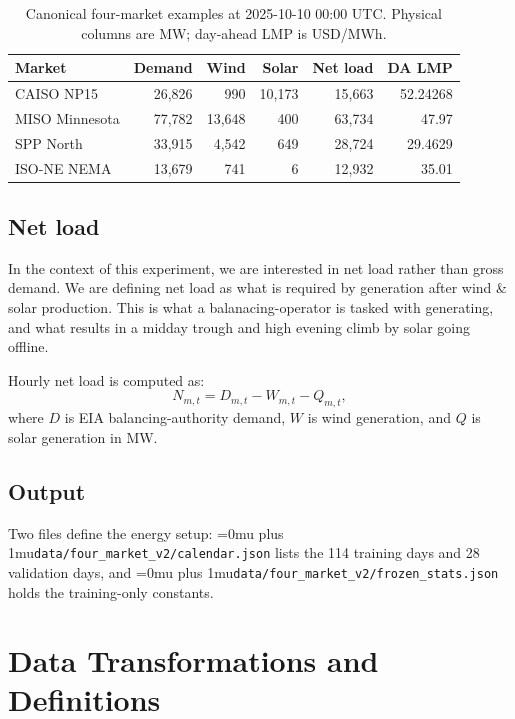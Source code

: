 \documentclass[conference]{IEEEtran}
\newcommand{\codepath}[1]{{\Urlmuskip=0mu plus 1mu\relax\nolinkurl{#1}}}
\begin{document}
\begin{table}[htbp]
  \centering
  \footnotesize
  \caption{Canonical four-market examples at 2025-10-10 00:00 UTC. Physical
  columns are MW; day-ahead LMP is USD/MWh.}
  \label{tab:energy-example-rows}
  \setlength{\tabcolsep}{4pt}
  \begin{tabular}{@{}lrrrrr@{}}
    \toprule
    Market & Demand & Wind & Solar & Net load & DA LMP \\
    \midrule
    CAISO NP15 & 26,826 & 990 & 10,173 & 15,663 & 52.24268 \\
    MISO Minnesota & 77,782 & 13,648 & 400 & 63,734 & 47.97 \\
    SPP North & 33,915 & 4,542 & 649 & 28,724 & 29.4629 \\
    ISO-NE NEMA & 13,679 & 741 & 6 & 12,932 & 35.01 \\
    \bottomrule
  \end{tabular}
\end{table}

\subsection{Net load}
\label{subsec:energy-net-load}

In the context of this experiment, we are interested in net load rather than gross demand. We are defining net load as what is required by generation after wind \& solar production. This is what a balanacing-operator is tasked with generating, and what results in a midday trough and high evening climb by solar going offline. 

Hourly net load is computed as:
\begin{equation}
  N_{m,t}
  =
  D_{m,t} - W_{m,t} - Q_{m,t},
  \label{eq:energy-net-load}
\end{equation}
where \(D\) is EIA balancing-authority demand, \(W\) is wind generation, and
\(Q\) is solar generation in MW.

\subsection{Output}
\label{subsec:energy-reproduction}

Two files define the energy setup: \codepath{data/four_market_v2/calendar.json} lists the 114 training days and 28 validation days, and \codepath{data/four_market_v2/frozen_stats.json} holds the training-only constants.

\section{Data Transformations and Definitions}
\label{sec:data-transformations}
\end{document}
